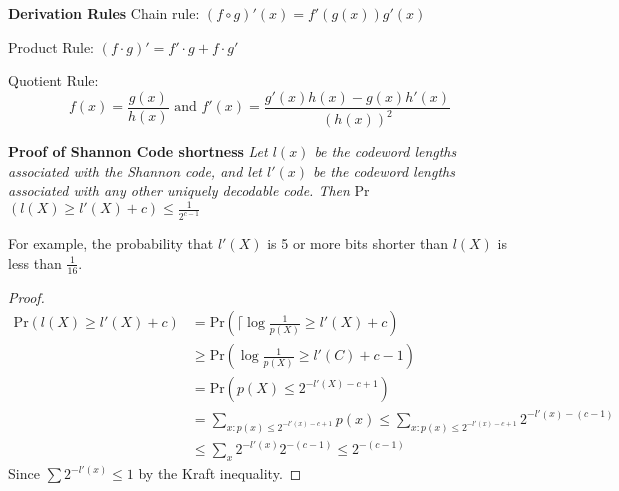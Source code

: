 \documentclass[10pt]{article}
\begin{document}
\begin{tiny}
\begin{multicols}{3}
{\bf Derivation Rules} Chain rule: $(f \circ g)'(x)=f'(g(x))g'(x)$

Product Rule: $(f\cdot g)' = f' \cdot g + f \cdot g'$

Quotient Rule: \[f(x)=\frac{g(x)}{h(x)}\text{ and }f'(x)=\frac{g'(x)h(x)-g(x)h'(x)}{\left(h(x)\right)^2}\]




\textbf{\scriptsize Proof of Shannon Code shortness}
{\it Let $l(x)$ be the codeword lengths associated with the Shannon code, and let $l'(x)$ be the codeword lengths associated with any other uniquely decodable code. Then} Pr$(l(X) \geq l'(X) + c)\leq \frac{1}{2^{c-1}}$

For example, the probability that $l'(X)$ is 5 or more bits shorter than $l(X)$ is less than $\frac{1}{16}$. 

\begin{proof}
\begin{align*}
\text{Pr}(l(X) \geq l'(X) + c)
&= \text{Pr}\left(\lceil \log \frac{1}{p(X)} \geq l'(X) + c \right) \\
&\geq \text{Pr}\left( \log \frac{1}{p(X)} \geq l'(C) + c - 1 \right)\\
&=\text{Pr}\left( p(X) \leq 2^{-l'(X)-c+1}\right) \\
&=\sum_{x:p(x)\leq 2^{-l'(x)-c+1}} p(x)
\leq \sum_{x:p(x)\leq 2^{-l'(x)-c+1}}2^{-l'(x)-(c-1)} \\
&\leq \sum_{x}2^{-l'(x)}2^{-(c-1)}
\leq 2^{-(c-1)} 
\end{align*}
Since $\sum 2^{-l'(x)} \leq 1$ by the Kraft inequality.
\end{proof}


\end{multicols}
\end{tiny}
\end{document}

